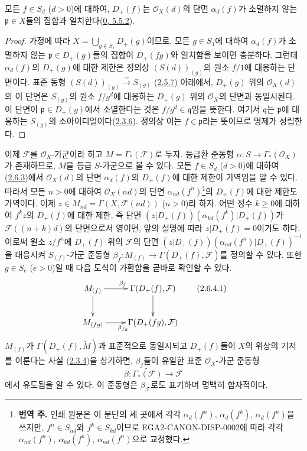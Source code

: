\begin{proposition}[2.6.3]
\label{II.2.6.3-ko}
모든 $f\in S_d$ ($d>0$)에 대하여, $D_+(f)$는 $\mathcal{O}_X(d)$의
단면 $\alpha_d(f)$가 소멸하지 않는 $\mathfrak{p}\in X$들의 집합과
일치한다(\hyperref[0.5.5.2-ko]{0, 5.5.2}).
\end{proposition}

\begin{proof}
가정에 따라 $X=\bigcup_{g\in S_1}D_+(g)$이므로, 모든 $g\in S_1$에
대하여 $\alpha_d(f)$가 소멸하지 않는 $\mathfrak{p}\in D_+(g)$들의
집합이 $D_+(fg)$와 일치함을 보이면 충분하다. 그런데 $\alpha_d(f)$의
$D_+(g)$에 대한 제한은 정의상 $(S(d))_{(g)}$의 원소 $f/1$에 대응하는
단면이다. 표준 동형
$(S(d))_{(g)}\xrightarrow{\sim}S_{(g)}$
(\hyperref[II.2.5.7-ko]{2.5.7}) 아래에서, $D_+(g)$ 위의
$\mathcal{O}_X(d)$의 이 단면은 $S_{(g)}$의 원소 $f/g^d$에 대응하는
$D_+(g)$ 위의 $\mathcal{O}_X$의 단면과 동일시된다. 이 단면이
$\mathfrak{p}\in D_+(g)$에서 소멸한다는 것은 $f/g^d\in\mathfrak{q}$임을
뜻한다. 여기서 $\mathfrak{q}$는 $\mathfrak{p}$에 대응하는 $S_{(g)}$의
소아이디얼이다(\hyperref[II.2.3.6-ko]{2.3.6}). 정의상 이는
$f\in\mathfrak{p}$라는 뜻이므로 명제가 성립한다.
\end{proof}

\begin{env}[2.6.4]
\label{II.2.6.4-ko}
이제 $\mathcal{F}$를 $\mathcal{O}_X$-가군이라 하고
$M=\Gamma_*(\mathcal{F})$로 두자. 등급환 준동형
$\alpha:S\to\Gamma_*(\mathcal{O}_X)$가 존재하므로, $M$을 등급
$S$-가군으로 볼 수 있다. 모든 $f\in S_d$ ($d>0$)에 대하여
(\hyperref[II.2.6.3-ko]{2.6.3})에서 $\mathcal{O}_X(d)$의 단면
$\alpha_d(f)$의 $D_+(f)$에 대한 제한이 가역임을 알 수 있다. 따라서
모든 $n>0$에 대하여 $\mathcal{O}_X(nd)$의 단면
$\alpha_{nd}(f^n)$\footnote{\textbf{번역 주.} 인쇄 원문은 이 문단의 세
곳에서 각각 $\alpha_d(f^n)$, $\alpha_d(f^k)$, $\alpha_d(f^n)$을
쓰지만, $f^n\in S_{nd}$와 $f^k\in S_{kd}$이므로
EGA2-CANON-DISP-0002에 따라 각각 $\alpha_{nd}(f^n)$,
$\alpha_{kd}(f^k)$, $\alpha_{nd}(f^n)$으로 교정했다.}의 $D_+(f)$에
대한 제한도 가역이다. 이제
$z\in M_{nd}=\Gamma(X,\mathcal{F}(nd))$ ($n>0$)라 하자. 어떤 정수
$k\geq0$에 대하여 $f^kz$의 $D_+(f)$에 대한 제한, 즉
단면
$(z|D_+(f))(\alpha_{kd}(f^k)|D_+(f))$가
$\mathcal{F}((n+k)d)$의 단면으로서 영이면, 앞의 설명에 따라
$z|D_+(f)=0$이기도 하다. 이로써 원소 $z/f^n$에 $D_+(f)$ 위의
$\mathcal{F}$의 단면
$(z|D_+(f))(\alpha_{nd}(f^n)|D_+(f))^{-1}$을 대응시켜
$S_{(f)}$-가군 준동형
$\beta_f:M_{(f)}\to\Gamma(D_+(f),\mathcal{F})$를 정의할 수 있다.
또한 $g\in S_e$ ($e>0$)일 때 다음 도식이 가환함을 곧바로 확인할 수
있다.
\[
\label{II.2.6.4.1-ko}
  \xymatrix{
    M_{(f)}\ar[r]^{\beta_f}\ar[d]
    & \Gamma(D_+(f),\mathcal{F})\ar[d]\\
    M_{(fg)}\ar[r]_{\beta_{fg}}
    & \Gamma(D_+(fg),\mathcal{F})
  }
\tag{2.6.4.1}
\]
$M_{(f)}$가 $\Gamma(D_+(f),\widetilde{M})$과 표준적으로 동일시되고
$D_+(f)$들이 $X$의 위상의 기저를 이룬다는 사실
(\hyperref[II.2.3.4-ko]{2.3.4})을 상기하면, $\beta_f$들이 유일한 표준
$\mathcal{O}_X$-가군 준동형
\[
\label{II.2.6.4.2-ko}
  \beta:\widetilde{\Gamma_*(\mathcal{F})}
  \longrightarrow\mathcal{F}
\tag{2.6.4.2}
\]
에서 유도됨을 알 수 있다. 이 준동형은 $\beta_{\mathcal{F}}$로도
표기하며 명백히 함자적이다.
\end{env}

